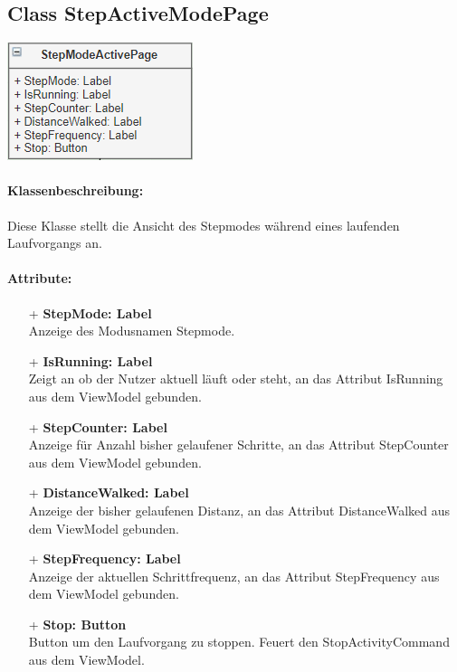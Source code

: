 \documentclass[a4paper,12pt]{article}
\begin{document}
\begin{minipage}[b]{0.7\textwidth}
	\subsection{Class StepActiveModePage}
\end{minipage}
\begin{minipage}[c]{0.3\textwidth}
	\includegraphics[width=\textwidth]{bilder/ViewKlassen/StepModeActivePage.png}
\end{minipage}
\paragraph{Klassenbeschreibung:}
Diese Klasse stellt die Ansicht des Stepmodes während eines laufenden Laufvorgangs an.
\paragraph{Attribute:}
	\begin{itemize}
	\item[+] \textbf{StepMode: Label} \\ Anzeige des Modusnamen Stepmode.
	\item[+] \textbf{IsRunning: Label} \\ Zeigt an ob der Nutzer aktuell läuft oder steht, an das Attribut IsRunning aus dem ViewModel gebunden.
	\item[+] \textbf{StepCounter: Label} \\ Anzeige für Anzahl bisher gelaufener Schritte, an das Attribut StepCounter aus dem ViewModel gebunden.
	\item[+] \textbf{DistanceWalked: Label} \\ Anzeige der bisher gelaufenen Distanz, an das Attribut DistanceWalked aus dem ViewModel gebunden.
	\item[+] \textbf{StepFrequency: Label} \\ Anzeige der aktuellen Schrittfrequenz, an das Attribut StepFrequency aus dem ViewModel gebunden.
	\item[+] \textbf{Stop: Button} \\ Button um den Laufvorgang zu stoppen. Feuert den StopActivityCommand aus dem ViewModel.
	\end{itemize}
	
\end{document}
